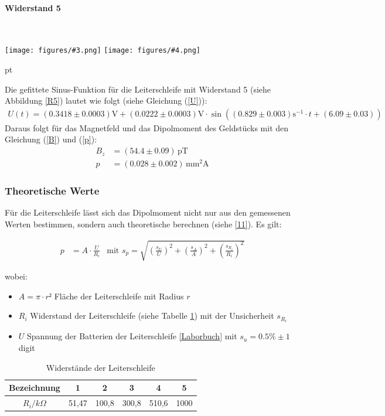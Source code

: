 \documentclass[12pt]{article}
\newcommand{\graTwoB}[5]{
	\begin{minipage}[h!]{\textwidth}
		\centering
		\texttt{[image: figures/\#3.png]}
		\texttt{[image: figures/\#4.png]}
		\captionof{figure}{#5}
	\end{minipage}
	\vskip 30 pt
}
\begin{document}
\paragraph{Widerstand 5}\ \\
\graTwoB{0.65}{0.34}{R5_Sinusfit}{R5_polar-plot}{Widerstand R5 \label{R5}}

Die gefittete Sinus-Funktion für die Leiterschleife mit Widerstand 5 (siehe Abbildung \ref{R5}) lautet wie folgt (siehe Gleichung (\ref{U})):
\begin{align*}
	U(t)=(0.3418\pm0.0003)\mathrm V+(0.0222\pm0.0003)\mathrm V\cdot \sin((0.829 \pm 0.003)\mathrm{s^{-1}}\cdot t + (6.09 \pm 0.03))
\end{align*}
Daraus folgt für das Magnetfeld und das Dipolmoment des Geldstücks mit den Gleichung (\ref{B}) und (\ref{p}):
\begin{align*}
	B_z&=(54.4 \pm 0.09)\,\mathrm{pT}\\
	p&=(0.028 \pm 0.002)\,\mathrm{mm^2A}
\end{align*}
\newpage
\subsubsection{Theoretische Werte}

Für die Leiterschleife lässt sich das Dipolmoment nicht nur aus den gemessenen Werten bestimmen, sondern auch theoretische berechnen (siehe \ref{11}). Es gilt:

\begin{align*}
p &= A \cdot \frac{U}{R_i} &\text{mit } s_p = \sqrt{\left( \frac{s_U}{U}\right)^2  + \left( \frac{s_A}{A} \right)^2 + \left( \frac{s_{R_i}}{R_i}\right)^2 } 
\end{align*}

wobei:

\begin{itemize}
\item $A = \pi \cdot r² $ Fläche der Leiterschleife mit Radius $r$
\item $R_i$ Widerstand der Leiterschleife (siehe Tabelle \ref{Tab}) mit der Unsicherheit $s_{R_i}$
\item$U$ Spannung der Batterien der Leiterschleife \ref{Laborbuch} mit $s_u = 0.5 \% \pm 1$ digit
\end{itemize}

\begin{table}[h!]
	\centering
	\begin{tabular}{c|c|c|c|c|c}
	Bezeichnung& 1& 2& 3& 4& 5 \\ \hline
	$R_i/k \Omega$ & 51,47&	100,8& 300,8 & 510,6 & 1000\\ 
	\end{tabular} 
\caption{Widerstände der Leiterschleife}	\label{Tab}
\end{table}
\end{document}
